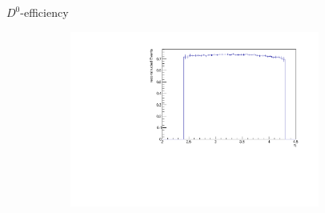 \documentclass[11pt]{beamer}
\begin{document}
\begin{frame}{$D^0$-efficiency}
\begin{figure}
\begin{subfigure}{0.45\textwidth}
\end{subfigure}
\begin{subfigure}{0.45\textwidth}
\includegraphics[width=0.9\textwidth]{up_pdf/tot/h_eta_reco_D0.pdf}
\end{subfigure}
\end{figure}
\end{frame}
\end{document}
